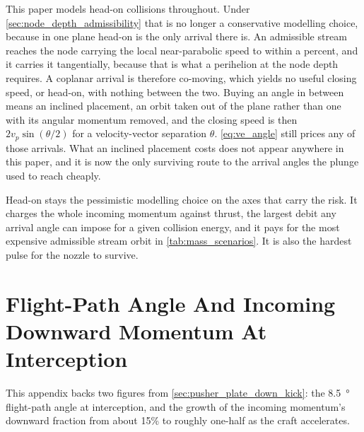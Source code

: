 \documentclass{article}
\begin{document}
This paper models head-on collisions throughout. Under \autoref{sec:node_depth_admissibility} that is no longer a conservative modelling choice, because in one plane head-on is the only arrival there is. An admissible stream reaches the node carrying the local near-parabolic speed to within a percent, and it carries it tangentially, because that is what a perihelion at the node depth requires. A coplanar arrival is therefore co-moving, which yields no useful closing speed, or head-on, with nothing between the two. Buying an angle in between means an inclined placement, an orbit taken out of the plane rather than one with its angular momentum removed, and the closing speed is then $2v_p\sin(\theta/2)$ for a velocity-vector separation $\theta$. \autoref{eq:ve_angle} still prices any of those arrivals. What an inclined placement costs does not appear anywhere in this paper, and it is now the only surviving route to the arrival angles the plunge used to reach cheaply.

Head-on stays the pessimistic modelling choice on the axes that carry the risk. It charges the whole incoming momentum against thrust, the largest debit any arrival angle can impose for a given collision energy, and it pays for the most expensive admissible stream orbit in \autoref{tab:mass_scenarios}. It is also the hardest pulse for the nozzle to survive.

\section{Flight-Path Angle And Incoming Downward Momentum At Interception}\label{sec:down_angle_geometry}
This appendix backs two figures from \autoref{sec:pusher_plate_down_kick}: the \SI{8.5}{\degree} flight-path angle at interception, and the growth of the incoming momentum's downward fraction from about 15\% to roughly one-half as the craft accelerates.
\end{document}
